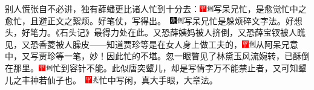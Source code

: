 别人慌张自不必讲，独有薛蟠更比诸人忙到十分去：{\includegraphics[width=3mm]{../Images/00002}\includegraphics[width=3mm]{../Images/00011}\footnotesize \kaishu 写呆兄忙，是愈觉忙中之愈忙，且避正文之絮烦。好笔仗，写得出。　\includegraphics[width=3mm]{../Images/00004}\includegraphics[width=3mm]{../Images/00011}\footnotesize \kaishu 写呆兄忙是躲烦碎文字法。好想头，好笔力。《石头记》最得力处在此。}又恐薛姨妈被人挤倒，又恐薛宝钗被人瞧见，又恐香菱被人臊皮------知道贾珍等是在女人身上做工夫的，{\includegraphics[width=3mm]{../Images/00002}\includegraphics[width=3mm]{../Images/00011}\footnotesize \kaishu 从阿呆兄意中，又写贾珍等一笔，妙！}因此忙的不堪。忽一眼瞥见了林黛玉风流婉转，已酥倒在那里。{\includegraphics[width=3mm]{../Images/00002}\includegraphics[width=3mm]{../Images/00011}\footnotesize \kaishu 忙到容针不能。此似唐突颦儿，却是写情字万不能禁止者，又可知颦儿之丰神若仙子也。　\includegraphics[width=3mm]{../Images/00002}\includegraphics[width=3mm]{../Images/00012}\footnotesize \kaishu 忙中写闲，真大手眼，大章法。}

